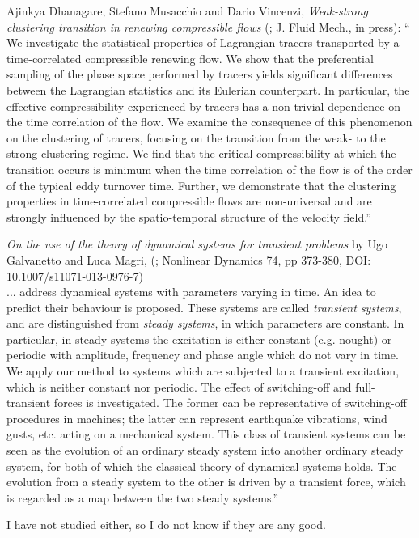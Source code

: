 \documentclass[letter,10pt,openany]{article}
\begin{document}
\begin{description}
{Ajinkya Dhanagare, Stefano Musacchio and Dario Vincenzi,
{\em Weak-strong clustering transition in renewing compressible flows}
(; J. Fluid Mech., in press):
``
  We investigate the statistical properties of Lagrangian tracers transported
by a time-correlated compressible renewing flow. We show that the preferential
sampling of the phase space performed by tracers yields significant differences
between the Lagrangian statistics and its Eulerian counterpart. In particular,
the effective compressibility experienced by tracers has a non-trivial
dependence on the time correlation of the flow. We examine the consequence of
this phenomenon on the clustering of tracers, focusing on the transition from
the weak- to the strong-clustering regime. We find that the critical
compressibility at which the transition occurs is minimum when the time
correlation of the flow is of the order of the typical eddy turnover time.
Further, we demonstrate that the clustering properties in time-correlated
compressible flows are non-universal and are strongly influenced by the
spatio-temporal structure of the velocity field.''

\emph{On the use of the theory of dynamical systems for transient problems}
by Ugo Galvanetto and Luca Magri,
(;
Nonlinear Dynamics 74,  pp 373-380,
DOI: 10.1007/s11071-013-0976-7)
\\
 ... address dynamical systems
with parameters varying in time. An idea to predict their behaviour is
proposed. These systems are called \emph{transient systems}, and are
distinguished from \emph{steady systems}, in which parameters are constant. In
particular, in steady systems the excitation is either constant (e.g. nought)
or periodic with amplitude, frequency and phase angle which do not vary in
time. We apply our method to systems which are subjected to a transient
excitation, which is neither constant nor periodic. The effect of switching-off
and full-transient forces is investigated. The former can be representative of
switching-off procedures in machines; the latter can represent earthquake
vibrations, wind gusts, etc. acting on a mechanical system. This class of
transient systems can be seen as the evolution of an ordinary steady system
into another ordinary steady system, for both of which the classical theory of
dynamical systems holds. The evolution from a steady system to the other is
driven by a transient force, which is regarded as a map between the two steady
systems.''

I have not studied either, so I do not know if they are any good.
   }


\end{description}
\end{document}
